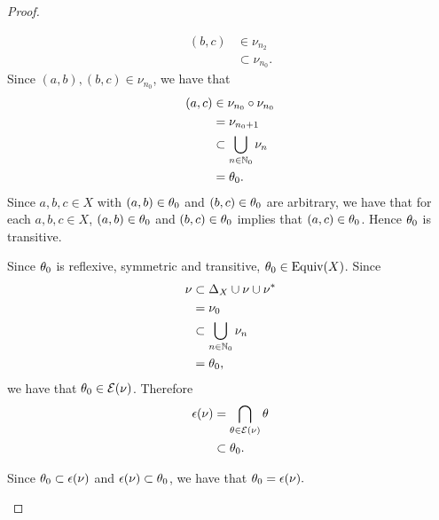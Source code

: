 \begin{proof}
\begin{enumerate}
\begin{itemize}
\begin{itemize}
\begin{align*}
					(b,c)
					& \in \nu_{n_2} \\
					& \subset \nu_{n_0}.
				\end{align*}
				Since $(a,b), (b,c) \in \nu_{n_0}$, we have that 
				\begin{align*}
					(a,c)
					& \in \nu_{n_0} \circ \nu_{n_0} \\
					& = \nu_{n_0+1} \\
					& \subset \bigcup\limits_{n \in \mathbb{N}_0} \nu_n \\
					& = \theta_0.
				\end{align*}
				Since $a,b,c \in X$ with $(a,b) \in \theta_0$ and $(b,c) \in \theta_0$ are arbitrary, we have that for each $a,b,c \in X$, $(a,b) \in \theta_0$ and $(b,c) \in \theta_0$ implies that $(a,c) \in \theta_0$. Hence $\theta_0$ is transitive.  
			\end{itemize}
			Since $\theta_0$ is reflexive, symmetric and transitive, $\theta_0 \in \operatorname*{\text{Equiv}}(X)$. Since
			\begin{align*}
				\nu
				& \subset \Delta_X \cup \nu \cup \nu^* \\
				& = \nu_0 \\
				& \subset \bigcup\limits_{n \in \mathbb{N}_0} \nu_n \\ 
				& = \theta_0,
			\end{align*}
			we have that $\theta_0 \in \mathcal{E}(\nu)$. Therefore 
			\begin{align*}
				\epsilon(\nu)
				& = \bigcap\limits_{\theta \in \mathcal{E}(\nu)} \theta \\
				& \subset \theta_0 .
			\end{align*}
			\end{itemize}
			Since $\theta_0 \subset \epsilon(\nu)$ and $\epsilon(\nu) \subset \theta_0$, we have that $\theta_0 = \epsilon(\nu).$
	\end{enumerate}
\end{proof}



























































